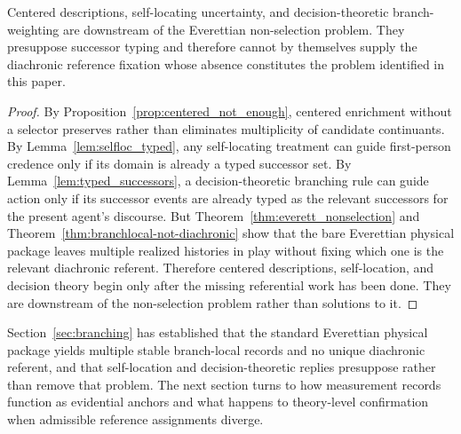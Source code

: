 \begin{theorem}
\label{thm:downstream}
Centered descriptions, self-locating uncertainty, and decision-theoretic branch-weighting are
downstream of the Everettian non-selection problem. They presuppose successor typing and therefore
cannot by themselves supply the diachronic reference fixation whose absence constitutes the problem
identified in this paper.
\end{theorem}

\begin{proof}
By Proposition~\ref{prop:centered_not_enough}, centered enrichment without a selector preserves
rather than eliminates multiplicity of candidate continuants. By Lemma~\ref{lem:selfloc_typed}, any
self-locating treatment can guide first-person credence only if its domain is already a typed successor
set. By Lemma~\ref{lem:typed_successors}, a decision-theoretic branching rule can guide action only if
its successor events are already typed as the relevant successors for the present agent's discourse. But
Theorem~\ref{thm:everett_nonselection} and
Theorem~\ref{thm:branchlocal-not-diachronic} show that the bare Everettian physical package leaves
multiple realized histories in play without fixing which one is the relevant diachronic referent.
Therefore centered descriptions, self-location, and decision theory begin only after the missing
referential work has been done. They are downstream of the non-selection problem rather than solutions to it.
\end{proof}

Section~\ref{sec:branching} has established that the standard Everettian physical package yields multiple stable branch-local records and no unique diachronic referent, and that self-location and decision-theoretic replies presuppose rather than remove that problem. The next section turns to how measurement records function as evidential anchors and what happens to theory-level confirmation when admissible reference assignments diverge.
